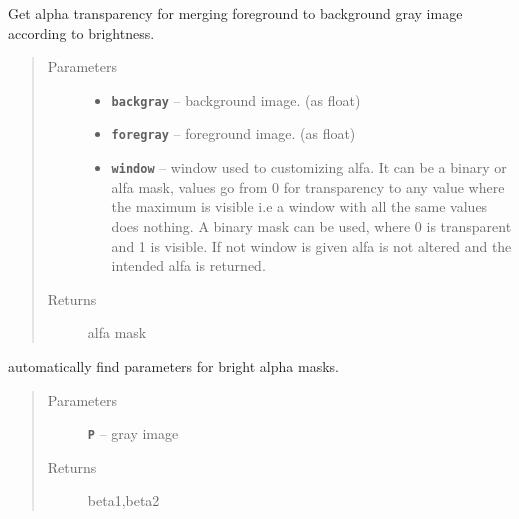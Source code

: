 \documentclass[letterpaper,10pt,english]{sphinxmanual}
\begin{document}
\begin{fulllineitems}
\label{RRtoolbox.tools:RRtoolbox.tools.segmentation.getBrightAlpha}
Get alpha transparency for merging foreground to background gray image according to brightness.
\begin{quote}\begin{description}
\item[{Parameters}] \leavevmode\begin{itemize}
\item {} 
\textbf{\texttt{backgray}} -- background image. (as float)

\item {} 
\textbf{\texttt{foregray}} -- foreground image. (as float)

\item {} 
\textbf{\texttt{window}} -- window used to customizing alfa. It can be a binary or alfa mask, values go from 0 for transparency
to any value where the maximum is visible i.e a window with all the same values does nothing.
A binary mask can be used, where 0 is transparent and 1 is visible.
If not window is given alfa is not altered and the intended alfa is returned.

\end{itemize}

\item[{Returns}] \leavevmode
alfa mask

\end{description}\end{quote}

\end{fulllineitems}


\begin{fulllineitems}
\label{RRtoolbox.tools:RRtoolbox.tools.segmentation.get_beta_params}
automatically find parameters for bright alpha masks.
\begin{quote}\begin{description}
\item[{Parameters}] \leavevmode
\textbf{\texttt{P}} -- gray image

\item[{Returns}] \leavevmode
beta1,beta2

\end{description}\end{quote}

\end{fulllineitems}
\end{document}
